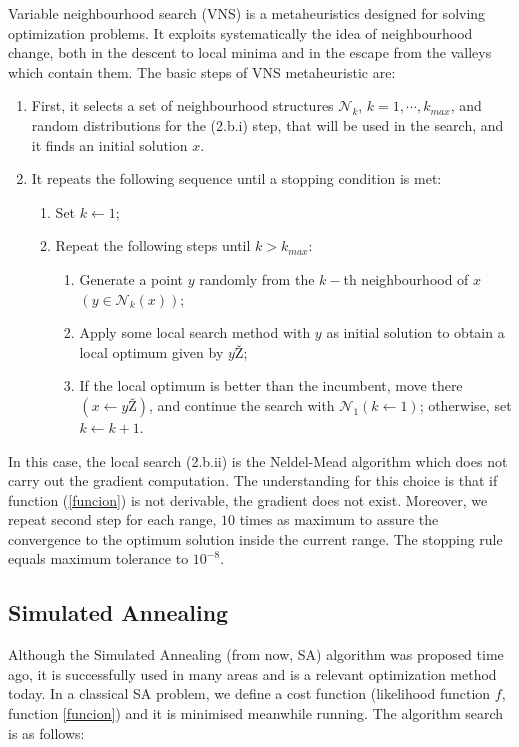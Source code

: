 \documentclass{sig-alternate}
\begin{document}
Variable neighbourhood search (VNS) \cite{VNS} is a metaheuristics designed for solving optimization problems. It exploits systematically the idea of neighbourhood change, both in the descent to local minima and in the escape from the valleys which contain them. The basic steps of VNS metaheuristic are:

\begin{enumerate}
\item First, it selects a set of neighbourhood structures $\mathcal N_k$, $k=1,\cdots,k_{max}$, and random distributions for the (2.b.i) step, that will be used in the search, and it finds an initial solution $x$.
\item It repeats the following sequence until a stopping condition is met:
    \begin{enumerate}
        \item Set $k\leftarrow 1$;
        \item Repeat the following steps until $k>k_{max}$:
        \begin{enumerate}
            \item Generate a point $y$ randomly from the $k-$th neighbourhood of $x$ $(y\in\mathcal N_{k}(x))$;
                \item Apply some local search method with $y$ as initial solution to obtain a local optimum given by $yŽ$;
                \item If the local optimum is better than the incumbent, move there $(x\leftarrow yŽ)$, and continue the search with $\mathcal N_1 (k\leftarrow 1)$; otherwise, set $k\leftarrow k+1$.
        \end{enumerate}
    \end{enumerate}

\end{enumerate}

In this case, the local search (2.b.ii) is the Neldel-Mead algorithm which does not carry out the gradient computation. The understanding for this choice is that if function (\ref{funcion}) is not derivable, the gradient does not exist. Moreover, we repeat second step for each range, $10$ times as maximum to assure the convergence to the optimum solution inside the current range. The stopping rule equals maximum tolerance to $10^{-8}$.





\subsection{Simulated Annealing}
\label{subsec:SA}
Although the Simulated Annealing (from now, SA) \cite{SA} algorithm was proposed time ago, it is successfully used in many areas and is a relevant optimization method today. In a classical SA \cite{SA} problem, we define a cost function (likelihood function $f$, function \ref{funcion}) and it is minimised meanwhile running.  The algorithm search is as follows:
\end{document}
